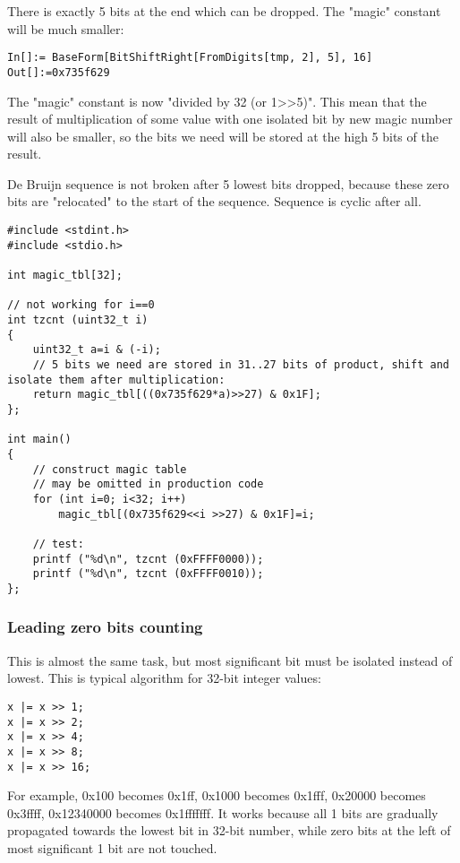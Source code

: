 There is exactly 5 bits at the end which can be dropped.
The "magic" constant will be much smaller:

\begin{lstlisting}
In[]:= BaseForm[BitShiftRight[FromDigits[tmp, 2], 5], 16]
Out[]:=0x735f629
\end{lstlisting}

The "magic" constant is now "divided by 32 (or 1>>5)".
This mean that the result of multiplication of some value with one isolated bit by new magic number will also be smaller, so the bits we need will
be stored at the high 5 bits of the result.

De Bruijn sequence is not broken after 5 lowest bits dropped, because these zero bits are "relocated" to the start of the sequence.
Sequence is cyclic after all.

\begin{lstlisting}[style=customc]
#include <stdint.h>
#include <stdio.h>

int magic_tbl[32];

// not working for i==0
int tzcnt (uint32_t i)
{
	uint32_t a=i & (-i);
	// 5 bits we need are stored in 31..27 bits of product, shift and isolate them after multiplication:
	return magic_tbl[((0x735f629*a)>>27) & 0x1F];
};

int main()
{
	// construct magic table
	// may be omitted in production code
	for (int i=0; i<32; i++)
		magic_tbl[(0x735f629<<i >>27) & 0x1F]=i;
	
	// test:
	printf ("%d\n", tzcnt (0xFFFF0000));
	printf ("%d\n", tzcnt (0xFFFF0010));
};
\end{lstlisting}

\subsubsection{Leading zero bits counting}

This is almost the same task, but most significant bit must be isolated instead of lowest.
This is typical algorithm for 32-bit integer values:

\begin{lstlisting}
x |= x >> 1;
x |= x >> 2;
x |= x >> 4;
x |= x >> 8;
x |= x >> 16;
\end{lstlisting}

For example, 0x100 becomes 0x1ff, 0x1000 becomes 0x1fff, 0x20000 becomes 0x3ffff, 0x12340000 becomes 0x1fffffff.
It works because all 1 bits are gradually propagated towards the lowest bit in 32-bit number,
while zero bits at the left of most significant 1 bit are not touched.

